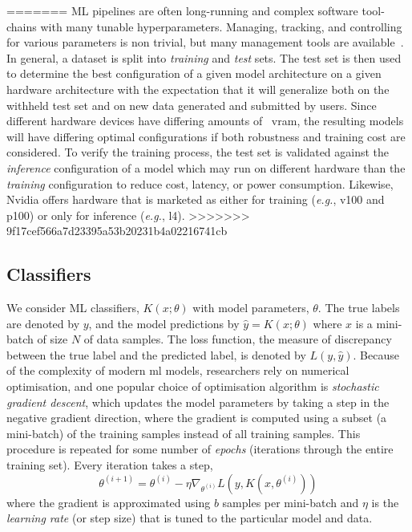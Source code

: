 \documentclass[sn-mathphys-num]{sn-jnl}%
\begin{document}
=======
ML pipelines are often long-running and complex software tool-chains with many tunable hyperparameters. 
Managing, tracking, and controlling for various parameters is non trivial, but many management tools are available~\cite{dvc,hydra,k8s}. 
In general, a dataset is split into \textit{training} and \textit{test} sets. 
The test set is then used to determine the best configuration of a given model architecture on a given hardware architecture with the expectation that it will generalize both on the withheld test set and on new data generated and submitted by users. 
Since different hardware devices have differing amounts of ~\acrfull{vram}, the resulting models will have differing optimal configurations if both robustness and training cost are considered.
To verify the training process, the test set is validated against the \textit{inference} configuration of a model which may run on different hardware than the \textit{training} configuration to reduce cost, latency, or power consumption. Likewise, Nvidia offers hardware that is marketed as either for training (\textit{e.g.}, v100 and p100) or only for inference (\textit{e.g.}, l4).
>>>>>>> 9f17cef566a7d23395a53b20231b4a02216741cb

\subsection{Classifiers}

We consider ML classifiers, $K(x; \theta)$ with model parameters, $\theta$. The true labels are denoted by $y$, and the model predictions by $\hat{y} = K(x; \theta)$ where $x$ is a mini-batch of size $N$ of data samples. The loss function, the measure of discrepancy between the true label and the predicted label, is denoted by $L(y, \hat{y})$.
Because of the complexity of modern \acrshort{ml} models, researchers rely on numerical optimisation, and one popular choice of optimisation algorithm is \textit{stochastic gradient descent}, which updates the model parameters by taking a step in the negative gradient direction, where the gradient is computed using a subset (a mini-batch) of the training samples instead of all training samples.
This procedure is repeated for some number of \textit{epochs} (iterations through the entire training set). Every iteration takes a step,
\begin{equation}
    \theta^{(i+1)} = \theta^{(i)} - \eta \nabla_{\theta^{(i)}} L(y, K(x, \theta^{(i)}))
    \label{eq:sgd}
\end{equation}
where the gradient is approximated using $b$ samples per mini-batch and $\eta$ is the \textit{learning rate} (or step size) that is tuned to the particular model and data.
\end{document}
